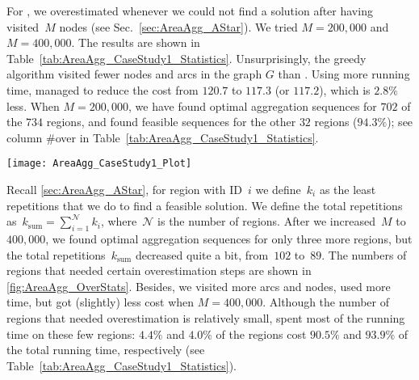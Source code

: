 For \Astar, we overestimated 
whenever we could not find a solution after 
having visited~$M$ nodes (see 
Sec.~\ref{sec:AreaAgg_AStar}).
We tried $M=200{,}000$ and $M=400{,}000$. 
The results are shown in Table~\ref{tab:AreaAgg_CaseStudy1_Statistics}.
%
Unsurprisingly, the greedy algorithm visited fewer nodes and 
arcs in the graph $G$ than \Astar.
Using more running time, 
\Astar managed to reduce the cost 
from $120.7$ to $117.3$ (or $117.2$), 
which is $2.8\%$ less.
%
When $M=200{,}000$, 
we have found optimal aggregation sequences for 
$702$ of the $734$ regions, 
and found feasible sequences 
for the other $32$ regions ($94.3\%$); 
see column \#over in Table~\ref{tab:AreaAgg_CaseStudy1_Statistics}.
\begin{table*}[tb]
	\centering
	\caption{A comparison of Greedy and \Astar		
			when using cost function~$g_1$.
			For \Astar, we used two settings, 
			i.e.,~$M=200{,}000$ and~$M=400{,}000$.
		Symbol~\#over is the number and percentage of regions
		(out of 734) that needed overestimation.
		Variable~$k_\mathrm{sum}$ is the total repetitions.
		Symbols~\#nodes and~\#arcs are the total 
		numbers of nodes and arcs that \Astar visited.  
		(For instances where we needed overestimation, 
		only the final attempt was counted.)
		Symbols $g_\mathrm{t}$, $g_\mathrm{c}$, and $g_1$
		denote the sums of $g_\mathrm{type}(\Pgoal)$,
		$g_\mathrm{comp}(\Pgoal)$, and $g_1(\Pgoal)$,
		respectively, over all instances (see 
		\eqs\ref{eq:g_type}, \ref{eq:g_comp}, 
		and~\ref{eq:g_1}).
		The percentage in the
		time column is the fraction of the total
		runtime spent on solving the instances
		that needed overestimation.
	}
	\label{tab:AreaAgg_CaseStudy1_Statistics}
	\texttt{[image: AreaAgg\_CaseStudy1\_Plot]} 
\end{table*}

Recall \sect\ref{sec:AreaAgg_AStar}, for region with 
ID~$i$ we 
define~$k_i$ as the least repetitions that we do to find a 
feasible solution. 
We define the total repetitions 
as~$k_\mathrm{sum}=\sum_{i=1}^\mathcal{N} k_i$, 
where~$\mathcal{N}$ is the number of regions.
After we increased~$M$ to~$400{,}000$, we found optimal 
aggregation sequences for only three more regions, 
but the total repetitions~$k_\mathrm{sum}$ decreased 
quite a bit, from~$102$ to~$89$. 
The numbers of regions that needed certain
overestimation steps are shown in 
\fig\ref{fig:AreaAgg_OverStats}. 
Besides, we visited more arcs and nodes, 
used more time, 
but got (slightly) less cost when $M=400{,}000$.
Although the number of regions 
that needed overestimation is relatively small, 
\Astar spent most of the running time 
on these few regions: $4.4\%$ and $4.0\%$ of the regions 
cost $90.5\%$ and $93.9\%$ of the total running time, 
respectively (see Table~\ref{tab:AreaAgg_CaseStudy1_Statistics}).

